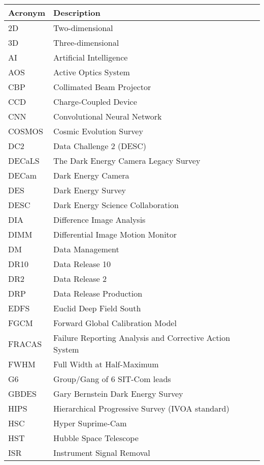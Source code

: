 \addtocounter{table}{-1}
\begin{longtable}{p{}p{}}\hline
\textbf{Acronym} & \textbf{Description}  \\\hline

2D & Two-dimensional \\\hline
3D & Three-dimensional \\\hline
AI & Artificial Intelligence \\\hline
AOS & Active Optics System \\\hline
CBP & Collimated Beam Projector \\\hline
CCD & Charge-Coupled Device \\\hline
CNN & Convolutional Neural Network \\\hline
COSMOS & Cosmic Evolution Survey \\\hline
DC2 & Data Challenge 2 (DESC) \\\hline
DECaLS & The Dark Energy Camera Legacy Survey \\\hline
DECam & Dark Energy Camera \\\hline
DES & Dark Energy Survey \\\hline
DESC & Dark Energy Science Collaboration \\\hline
DIA & Difference Image Analysis \\\hline
DIMM & Differential Image Motion Monitor \\\hline
DM & Data Management \\\hline
DR10 & Data Release 10 \\\hline
DR2 & Data Release 2 \\\hline
DRP & Data Release Production \\\hline
EDFS & Euclid Deep Field South \\\hline
FGCM & Forward Global Calibration Model \\\hline
FRACAS & Failure Reporting Analysis and Corrective Action System \\\hline
FWHM & Full Width at Half-Maximum \\\hline
G6 & Group/Gang of 6 SIT-Com leads \\\hline
GBDES & Gary Bernstein Dark Energy Survey \\\hline
HIPS & Hierarchical Progressive Survey (IVOA standard) \\\hline
HSC & Hyper Suprime-Cam \\\hline
HST & Hubble Space Telescope \\\hline
ISR & Instrument Signal Removal \\\hline

\end{longtable}
